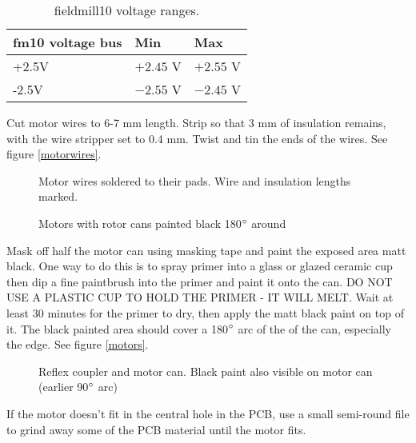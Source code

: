 \documentclass{article}
\begin{document}
\begin{table}[H]
\begin{centering}
\begin{tabular}{|l|l|l|}
\hline
{\bf fm10 voltage bus} & {\bf Min}    & {\bf Max} \\ \hline
+2.5V                  & $+2.45$ V    & $+2.55$ V \\ \hline
-2.5V                  & $-2.55$ V    & $-2.45$ V \\ \hline
\end{tabular}
\caption{fieldmill10 voltage ranges.}
\label{fm10_voltages}
\end{centering}
\end{table}

Cut motor wires to 6-7 mm length.
Strip so that 3 mm of insulation remains, with the wire stripper set to 0.4 mm.
Twist and tin the ends of the wires. See figure \vref{motorwires}.

\begin{figure}
\centering
\caption{Motor wires soldered to their pads. Wire and insulation lengths marked.}
\label{motorwires}
\end{figure}

\begin{figure}
\centering
\caption{Motors with rotor cans painted black 180$\degree$ around}
\label{motors}
\end{figure}


Mask off half the motor can using masking tape and paint the exposed area matt black.
One way to do this is to spray primer into a glass or glazed ceramic cup then dip a fine paintbrush into the primer and paint it onto the can.
DO NOT USE A PLASTIC CUP TO HOLD THE PRIMER - IT WILL MELT.
Wait at least 30 minutes for the primer to dry, then apply the matt black paint on top of it.
The black painted area should cover a 180$\degree$ arc of the of the can, especially the edge.
See figure \vref{motors}.

\begin{figure}
\centering
\caption{Reflex coupler and motor can. Black paint also visible on motor can (earlier 90$\degree$ arc)}
\label{reflectometer}
\end{figure}

If the motor doesn't fit in the central hole in the PCB, use a small semi-round file
to grind away some of the PCB material until the motor fits.
\end{document}
